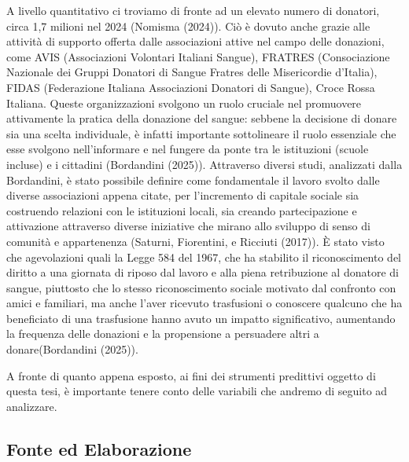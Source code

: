 \documentclass[
  italian,
  a4paper,
  a4paper,
  twoside,
  open=right,
  12pt]{scrbook}
\theoremstyle{definition}
\theoremstyle{remark}
\begin{document}
A livello quantitativo ci troviamo di fronte ad un elevato numero di
donatori, circa 1,7 milioni nel 2024 (Nomisma (2024)). Ciò è dovuto
anche grazie alle attività di supporto offerta dalle associazioni attive
nel campo delle donazioni, come AVIS (Associazioni Volontari Italiani
Sangue), FRATRES (Consociazione Nazionale dei Gruppi Donatori di Sangue
Fratres delle Misericordie d'Italia), FIDAS (Federazione Italiana
Associazioni Donatori di Sangue), Croce Rossa Italiana. Queste
organizzazioni svolgono un ruolo cruciale nel promuovere attivamente la
pratica della donazione del sangue: sebbene la decisione di donare sia
una scelta individuale, è infatti importante sottolineare il ruolo
essenziale che esse svolgono nell'informare e nel fungere da ponte tra
le istituzioni (scuole incluse) e i cittadini (Bordandini (2025)).
Attraverso diversi studi, analizzati dalla Bordandini, è stato possibile
definire come fondamentale il lavoro svolto dalle diverse associazioni
appena citate, per l'incremento di capitale sociale sia costruendo
relazioni con le istituzioni locali, sia creando partecipazione e
attivazione attraverso diverse iniziative che mirano allo sviluppo di
senso di comunità e appartenenza (Saturni, Fiorentini, e Ricciuti
(2017)). È stato visto che agevolazioni quali la Legge 584 del 1967, che
ha stabilito il riconoscimento del diritto a una giornata di riposo dal
lavoro e alla piena retribuzione al donatore di sangue, piuttosto che lo
stesso riconoscimento sociale motivato dal confronto con amici e
familiari, ma anche l'aver ricevuto trasfusioni o conoscere qualcuno che
ha beneficiato di una trasfusione hanno avuto un impatto significativo,
aumentando la frequenza delle donazioni e la propensione a persuadere
altri a donare(Bordandini (2025)).

A fronte di quanto appena esposto, ai fini dei strumenti predittivi
oggetto di questa tesi, è importante tenere conto delle variabili che
andremo di seguito ad analizzare.

\subsection{Fonte ed Elaborazione}\label{fonte-ed-elaborazione}
\end{document}
